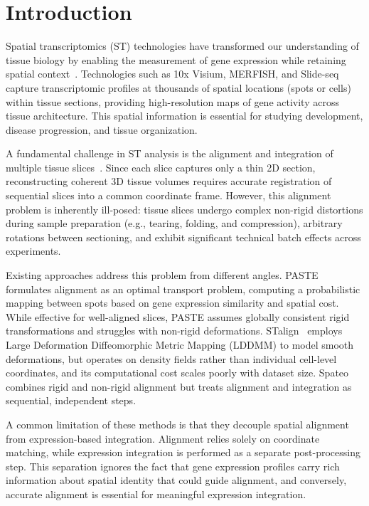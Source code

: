 \documentclass[runningheads]{llncs}
\begin{document}
\section{Introduction}

Spatial transcriptomics (ST) technologies have transformed our understanding of tissue biology by enabling the measurement of gene expression while retaining spatial context~\cite{ref_10x,ref_merfish}. Technologies such as 10x Visium, MERFISH, and Slide-seq capture transcriptomic profiles at thousands of spatial locations (spots or cells) within tissue sections, providing high-resolution maps of gene activity across tissue architecture. This spatial information is essential for studying development, disease progression, and tissue organization.

A fundamental challenge in ST analysis is the alignment and integration of multiple tissue slices~\cite{ref_paste}. Since each slice captures only a thin 2D section, reconstructing coherent 3D tissue volumes requires accurate registration of sequential slices into a common coordinate frame. However, this alignment problem is inherently ill-posed: tissue slices undergo complex non-rigid distortions during sample preparation (e.g., tearing, folding, and compression), arbitrary rotations between sectioning, and exhibit significant technical batch effects across experiments.

Existing approaches address this problem from different angles. PASTE~\cite{ref_paste} formulates alignment as an optimal transport problem, computing a probabilistic mapping between spots based on gene expression similarity and spatial cost. While effective for well-aligned slices, PASTE assumes globally consistent rigid transformations and struggles with non-rigid deformations. STalign~\cite{ref_stalign} employs Large Deformation Diffeomorphic Metric Mapping (LDDMM) to model smooth deformations, but operates on density fields rather than individual cell-level coordinates, and its computational cost scales poorly with dataset size. Spateo~\cite{ref_spateo} combines rigid and non-rigid alignment but treats alignment and integration as sequential, independent steps.

A common limitation of these methods is that they decouple spatial alignment from expression-based integration. Alignment relies solely on coordinate matching, while expression integration is performed as a separate post-processing step. This separation ignores the fact that gene expression profiles carry rich information about spatial identity that could guide alignment, and conversely, accurate alignment is essential for meaningful expression integration.
\end{document}
